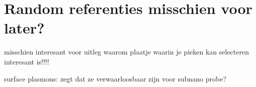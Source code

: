 
\section{Random referenties misschien voor later?}

\cite{brockt_lakner_2000} misschien interesant voor uitleg waarom plaatje waarin je pieken kan selecteren interesant is!!!!

surface plasmons: \cite{brockt_lakner_2000} zegt dat ze verwaarloosbaar zijn voor subnano probe?